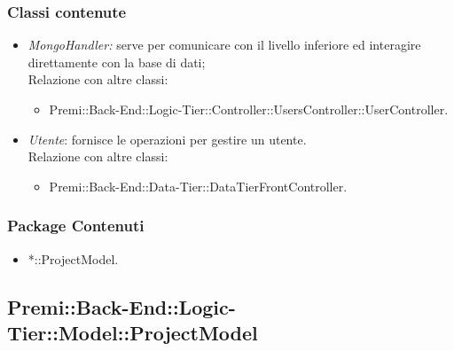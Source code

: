 	\subsubsection{Classi contenute}
	\begin{itemize}
		\item \textit{MongoHandler: }serve per comunicare con il livello inferiore ed interagire direttamente con la base di dati;
			\\Relazione con altre classi:
			\begin{itemize}
				\item Premi::Back-End::Logic-Tier::Controller::UsersController::UserController.
			\end{itemize}
		\item \textit{Utente}: fornisce le operazioni per gestire un utente.
			\\Relazione con altre classi:
			\begin{itemize}
				\item Premi::Back-End::Data-Tier::DataTierFrontController.
			\end{itemize}
	\end{itemize}
	
	\subsubsection{Package Contenuti}
	\begin{itemize}
		\item *::ProjectModel.
	\end{itemize}


\subsection{Premi::Back-End::Logic-Tier::Model::ProjectModel}
